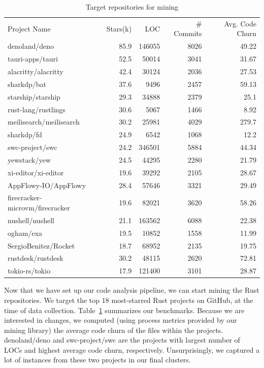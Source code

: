 \begin{table}
\caption{\label{table:repos} Target repositories for mining}
\begin{tabular}{l r r r r}
    Project Name & Stars(k) & LOC & \# Commits & Avg. Code Churn \\
    denoland/deno & 85.9 & 146055 & 8026 & 49.22 \\
    tauri-apps/tauri & 52.5 & 50014 & 3041 & 31.67 \\
    alacritty/alacritty & 42.4 & 30124 & 2036 & 27.53 \\
    sharkdp/bat & 37.6 & 9496 & 2457 & 59.13 \\
    starship/starship & 29.3 & 34888 & 2379 & 25.1 \\
    rust-lang/rustlings & 30.6 & 5067 & 1466 & 8.92 \\
    meilisearch/meilisearch & 30.2 & 25981 & 4029 & 279.7 \\
    sharkdp/fd & 24.9 & 6542 & 1068 & 12.2 \\
    swc-project/swc & 24.2 & 346501 & 5884 & 44.34 \\
    yewstack/yew & 24.5 & 44295 & 2280 & 21.79 \\
    xi-editor/xi-editor & 19.6 & 39292 & 2105 & 28.67 \\
    AppFlowy-IO/AppFlowy & 28.4 & 57646 & 3321 & 29.49 \\
    firecracker-microvm/firecracker & 19.6 & 82021 & 3620 & 58.26 \\
    nushell/nushell & 21.1 & 163562 & 6088 & 22.38 \\
    ogham/exa & 19.5 & 10852 & 1558 & 11.99 \\
    SergioBenitez/Rocket & 18.7 & 68952 & 2135 & 19.75 \\
    rustdesk/rustdesk & 30.2 & 48115 & 2620 & 72.81 \\
    tokio-rs/tokio & 17.9 & 121400 & 3101 & 28.87 
\end{tabular}
\end{table}
   

Now that we have set up our code analysis pipeline, we can start mining the Rust repositories. We target the top 18 most-starred Rust projects on GitHub, at the time of data collection. Table~\ref{table:repos} summarizes our benchmarks. Because we are interested in changes, we computed (using process metrics provided by our mining library) the average code churn of the files within the projects. denoland/deno and swc-project/swc are the projects with largest number of LOCs and highest average code churn, respectively. Unsurprisingly, we captured a lot of instances from these two projects in our final clusters.

